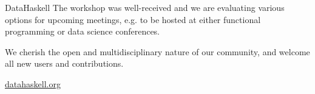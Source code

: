 \documentclass[DIV16,twocolumn,10pt]{scrreprt}
\begin{document}
\begin{hcarentry}{DataHaskell}
The workshop was well-received and we are evaluating various options for upcoming meetings, e.g. to be hosted at either functional programming or data science conferences.



We cherish the open and multidisciplinary nature of our community, and welcome all new users and contributions.

\FurtherReading
  \url{datahaskell.org}
\end{hcarentry}
\end{document}
